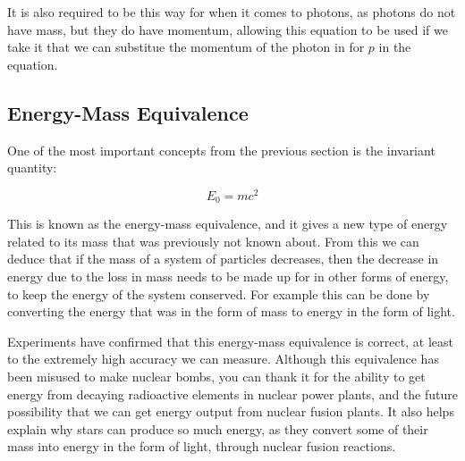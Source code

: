 It is also required to be this way for when it comes to photons, as photons do not have mass, but they do have momentum, allowing this equation to be used if we take it that we can substitue the momentum of the photon in for $p$ in the equation.

\subsection{Energy-Mass Equivalence} \label{subsect: Energy-Mass Equivalence}

One of the most important concepts from the previous section is the invariant quantity:

\begin{equation}
	E_0 = mc^2
\end{equation}

This is known as the energy-mass equivalence, and it gives a new type of energy related to its mass that was previously not known about.
From this we can deduce that if the mass of a system of particles decreases, then the decrease in energy due to the loss in mass needs to be made up for in other forms of energy, to keep the energy of the system conserved.
For example this can be done by converting the energy that was in the form of mass to energy in the form of light.

Experiments have confirmed that this energy-mass equivalence is correct, at least to the extremely high accuracy we can measure.
Although this equivalence has been misused to make nuclear bombs, you can thank it for the ability to get energy from decaying radioactive elements in nuclear power plants, and the future possibility that we can get energy output from nuclear fusion plants.
It also helps explain why stars can produce so much energy, as they convert some of their mass into energy in the form of light, through nuclear fusion reactions.





